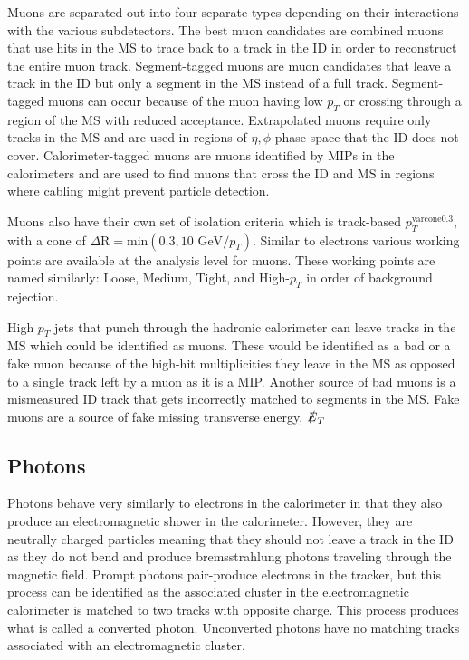 Muons are separated out into four separate types depending on their interactions with the various subdetectors.  The best muon candidates are combined muons that use hits in the MS to trace back to a track in the ID in order to reconstruct the entire muon track.  Segment-tagged muons are muon candidates that leave a track in the ID but only a segment in the MS instead of a full track.  Segment-tagged muons can occur because of the muon having low $p_T$ or crossing through a region of the MS with reduced acceptance.  Extrapolated muons require only tracks in the MS and are used in regions of $\eta, \phi$ phase space that the ID does not cover.  Calorimeter-tagged muons are muons identified by MIPs in the calorimeters and are used to find muons that cross the ID and MS in regions where cabling might prevent particle detection.

Muons also have their own set of isolation criteria which is track-based $p_{T}^{\text{varcone0.3}}$, with a cone of $\Delta \text{R} = \text{min}(0.3,10\text{ GeV}/p_T)$.  Similar to electrons various working points are available at the analysis level for muons.  These working points are named similarly: Loose, Medium, Tight, and High-$p_T$ in order of background rejection.  

High $p_T$ jets that punch through the hadronic calorimeter can leave tracks in the MS which could be identified as muons.  These would be identified as a bad or a fake muon because of the high-hit multiplicities they leave in the MS as opposed to a single track left by a muon as it is a MIP.  Another source of bad muons is a mismeasured ID track that gets incorrectly matched to segments in the MS.  Fake muons are a source of fake missing transverse energy, $ \slashed{E}_T$

\subsection{Photons}
Photons behave very similarly to electrons in the calorimeter in that they also produce an electromagnetic shower in the calorimeter.  However, they are neutrally charged particles meaning that they should not leave a track in the ID as they do not bend and produce bremsstrahlung photons traveling through the magnetic field.  Prompt photons pair-produce electrons in the tracker, but this process can be identified as the associated cluster in the electromagnetic calorimeter is matched to two tracks with opposite charge.  This process produces what is called a converted photon.  Unconverted photons have no matching tracks associated with an electromagnetic cluster.    

